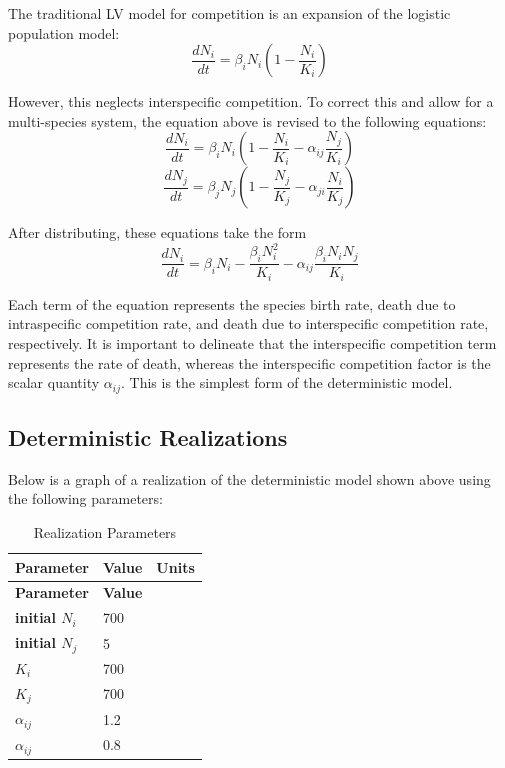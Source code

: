 \documentclass[twocolumn,prb,amsmath,amssymb,amsfonts,nobalancelastpage]{revtex4}
\begin{document}
The traditional LV model for competition is an expansion of the logistic population model:
$$\frac{dN_i}{dt}=\beta_i N_i(1-\frac{N_i}{K_i})$$

However, this neglects interspecific competition. To correct this and allow for a multi-species system, the equation above is revised to the following equations:
$$\frac{dN_i}{dt}=\beta_i N_i(1-\frac{N_i}{K_i}-\alpha_{ij}\frac{N_j}{K_i})$$
$$\frac{dN_j}{dt}=\beta_j N_j(1-\frac{N_j}{K_j}-\alpha_{ji}\frac{N_i}{K_j})$$

After distributing, these equations take the form
$$\frac{dN_i}{dt}=\beta_i N_i - \frac{\beta_i N_i^2}{K_i} - \alpha_{ij}\frac{\beta_i N_i N_j}{K_i}$$

Each term of the equation represents the species birth rate, death due to intraspecific competition rate, and death due to interspecific competition rate, respectively. It is important to delineate that the interspecific competition term represents the rate of death, whereas the interspecific competition factor is the scalar quantity $\alpha_{ij}$. This is the simplest form of the deterministic model.

\subsection{Deterministic Realizations}
Below is a graph of a realization of the deterministic model shown above using the following parameters:

\begin{xltabular}{\linewidth}{ X | X}
  \caption{Realization Parameters} 
 \label{table: vardescription}\\
 \hline \hline

\textbf{\normalsize Parameter} & \textbf{\normalsize Value} & \textbf{\normalsize Units} \\
 \hline 
\endfirsthead
 \hline \hline

\textbf{\normalsize Parameter} & \textbf{\normalsize Value} \\
 \hline 
\endhead

\textbf{initial $N_i$} & 700\\ \hline 

\textbf{initial $N_j$} & 5\\ \hline 

\textbf{$K_i$} & 700\\ \hline 

\textbf{$K_j$} & 700\\ \hline 

\textbf{$\alpha_{ij}$} & 1.2\\ \hline 

\textbf{$\alpha_{ij}$} & 0.8\\ \hline

\end{xltabular}
\end{document}

